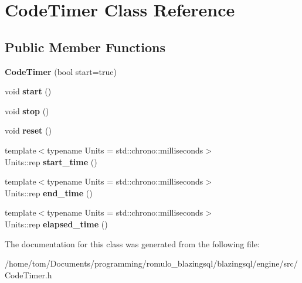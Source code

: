 \hypertarget{classCodeTimer}{}\section{Code\+Timer Class Reference}
\label{classCodeTimer}
\subsection*{Public Member Functions}
\begin{DoxyCompactItemize}
\item 
\mbox{\label{classCodeTimer_ac0fa5e40ff23c9546cc0e09726958f71}} 
{\bfseries Code\+Timer} (bool start=true)
\item 
\mbox{\label{classCodeTimer_af0737b8b16127370eaf3da619b71e037}} 
void {\bfseries start} ()
\item 
\mbox{\label{classCodeTimer_a8575aaa3fcc732f681634ba6335800ad}} 
void {\bfseries stop} ()
\item 
\mbox{\label{classCodeTimer_a9bdeff16d0890d913125404ca1aca114}} 
void {\bfseries reset} ()
\item 
\mbox{\label{classCodeTimer_af9bd67af986ca80d5054b7cc9a994a65}} 
{\footnotesize template$<$typename Units  = std\+::chrono\+::milliseconds$>$ }\\Units\+::rep {\bfseries start\+\_\+time} ()
\item 
\mbox{\label{classCodeTimer_abd480704f5bb9bda45f326e32062cda6}} 
{\footnotesize template$<$typename Units  = std\+::chrono\+::milliseconds$>$ }\\Units\+::rep {\bfseries end\+\_\+time} ()
\item 
\mbox{\label{classCodeTimer_a768a3829e64ffcee0836375ce7b92b73}} 
{\footnotesize template$<$typename Units  = std\+::chrono\+::milliseconds$>$ }\\Units\+::rep {\bfseries elapsed\+\_\+time} ()
\end{DoxyCompactItemize}


The documentation for this class was generated from the following file\+:\begin{DoxyCompactItemize}
\item 
/home/tom/\+Documents/programming/romulo\+\_\+blazingsql/blazingsql/engine/src/Code\+Timer.\+h\end{DoxyCompactItemize}
